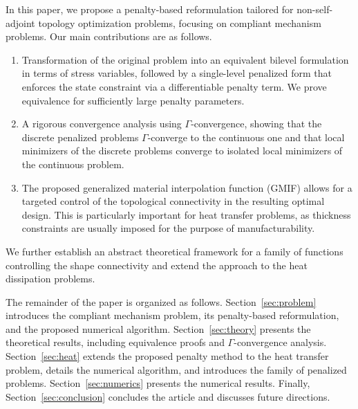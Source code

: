 \documentclass{amsart}
\begin{document}
In this paper, we propose a penalty-based reformulation tailored for non-self-adjoint topology optimization problems, focusing on compliant mechanism problems. Our main contributions are as follows.
\begin{enumerate}
    \item Transformation of the original problem into an equivalent bilevel formulation in terms of stress variables, followed by a single-level penalized form that enforces the state constraint via a differentiable penalty term. We prove equivalence for sufficiently large penalty parameters.
    
    \item A rigorous convergence analysis using \(\Gamma\)-convergence, showing that the discrete penalized problems \(\Gamma\)-converge to the continuous one and that local minimizers of the discrete problems converge to isolated local minimizers of the continuous problem. 
    
    \item The proposed generalized material interpolation function (GMIF) allows for a  targeted control of the topological connectivity in the resulting optimal design. This is particularly important for heat transfer problems, as thickness constraints are usually imposed for the purpose of  manufacturability. 
\end{enumerate}
We further establish an abstract theoretical framework for a family of functions controlling the shape connectivity and extend the approach to the heat dissipation problems.

The remainder of the paper is organized as follows. Section~\ref{sec:problem} introduces the compliant mechanism problem, its penalty-based reformulation, and the proposed numerical algorithm. Section~\ref{sec:theory} presents the theoretical results, including equivalence proofs and \(\Gamma\)-convergence analysis. Section~\ref{sec:heat} extends the proposed penalty method to the heat transfer problem, details the numerical algorithm, and introduces the family of penalized problems. Section~\ref{sec:numerics} presents the numerical results. Finally, Section~\ref{sec:conclusion} concludes the article and discusses future directions.
  
\end{document}
